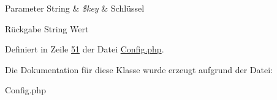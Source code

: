 \begin{DoxyParams}[1]{Parameter}
String & {\em \$key} & Schlüssel\\
\hline
\end{DoxyParams}
\begin{DoxyReturn}{Rückgabe}
String Wert 
\end{DoxyReturn}


Definiert in Zeile \hyperlink{_config_8php_source_l00051}{51} der Datei \hyperlink{_config_8php_source}{Config.\-php}.




Die Dokumentation für diese Klasse wurde erzeugt aufgrund der Datei\-:\begin{DoxyCompactItemize}
\item 
Config.\-php\end{DoxyCompactItemize}
